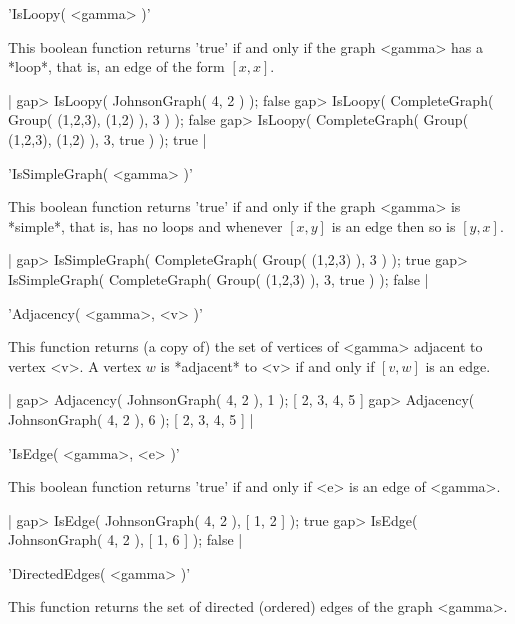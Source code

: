 
'IsLoopy( <gamma> )'

This boolean function returns 'true' if and only if the graph <gamma> has
a *loop*, that is, an edge of the form $[x,x]$.

|    gap> IsLoopy( JohnsonGraph( 4, 2 ) );
    false
    gap> IsLoopy( CompleteGraph( Group( (1,2,3), (1,2) ), 3 ) );
    false
    gap> IsLoopy( CompleteGraph( Group( (1,2,3), (1,2) ), 3, true ) );
    true |


'IsSimpleGraph( <gamma> )'

This boolean function returns 'true' if and  only if the graph <gamma> is
*simple*, that is, has no loops and whenever $[x,y]$  is an edge  then so
is $[y,x]$.

|    gap> IsSimpleGraph( CompleteGraph( Group( (1,2,3) ), 3 ) );
    true
    gap> IsSimpleGraph( CompleteGraph( Group( (1,2,3) ), 3, true ) );
    false |


'Adjacency( <gamma>, <v> )'

This function returns (a copy of) the set of vertices of <gamma> adjacent
to vertex <v>.  A vertex $w$ is *adjacent*  to <v> if and only if $[v,w]$
is an edge.

|    gap> Adjacency( JohnsonGraph( 4, 2 ), 1 );
    [ 2, 3, 4, 5 ]
    gap> Adjacency( JohnsonGraph( 4, 2 ), 6 );
    [ 2, 3, 4, 5 ] |


'IsEdge( <gamma>, <e> )'

This  boolean function returns 'true' if and  only  if <e> is an  edge of
<gamma>.

|    gap> IsEdge( JohnsonGraph( 4, 2 ), [ 1, 2 ] );
    true
    gap> IsEdge( JohnsonGraph( 4, 2 ), [ 1, 6 ] );
    false |


'DirectedEdges( <gamma> )'

This function  returns the  set of directed  (ordered) edges of the graph
<gamma>.

